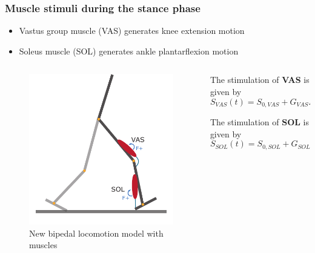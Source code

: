 \documentclass[10pt]{beamer}
\begin{document}
\begin{frame}
	\frametitle{Muscle stimuli during the stance phase}
	\begin{itemize}
		\item Vastus group muscle (VAS) generates knee extension motion
		\item Soleus muscle (SOL) generates ankle plantarflexion motion
	\end{itemize}

	\begin{columns}
		\begin{column}{.5\textwidth}
			\begin{figure}
				\centering
				\includegraphics[height=.45\textheight]{images/new_model/stance/muscle_vas_sol.pdf}
				\caption{New bipedal locomotion model with muscles}	
			\end{figure}
		\end{column}
		\begin{column}{.5\textwidth}
			\begin{block}{}
				The stimulation of \textbf{VAS} is given by
				\begin{equation*}
					S_{VAS}(t)=S_{0,VAS} + G_{VAS} F_{VAS} (t-\Delta t_{VAS})
				\end{equation*}
			\end{block}
			\begin{block}{}
				The stimulation of \textbf{SOL} is given by
				\begin{equation*}
					S_{SOL}(t)=S_{0,SOL} + G_{SOL} F_{SOL} (t-\Delta t_{SOL})
				\end{equation*}
			\end{block}		
		\end{column}
	\end{columns}
\end{frame}
\end{document}
